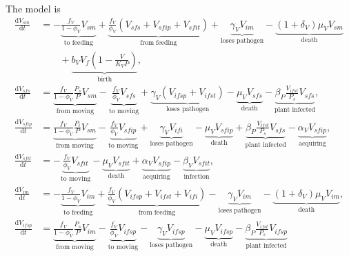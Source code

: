 \documentclass{article}
\newcommand{\md}{\mathrm{d}}
\begin{document}
The model is
\begin{equation}
  \label{odesystem}
  \begin{split}
    \frac{\md V_{sm}}{\md t}
    &=
    - \underbrace{\frac{f_V}{1 - \phi_V} V_{sm}}_{\text{to feeding}}
    + \underbrace{\frac{f_V}{\phi_V} (V_{sfs} + V_{sfip} + V_{sfit})}_{\text{from feeding}}
    + \underbrace{\gamma_V V_{im}}_{\text{loses pathogen}}
    - \underbrace{(1 + \delta_V) \mu_V V_{sm}}_{\text{death}}
    \\ & \quad\quad {}
    + \underbrace{b_V V_f \left(1 - \frac{V}{K_V P}\right)}_{\text{birth}},
    \\
    \frac{\md V_{sfs}}{\md t}
    &=
    \underbrace{\frac{f_V}{1 - \phi_V} \frac{P_s}{P} V_{sm}}_{\text{from moving}}
    - \underbrace{\frac{f_V}{\phi_V} V_{sfs}}_{\text{to moving}}
    + \underbrace{\gamma_V (V_{ifsp} + V_{ifst})}_{\text{loses pathogen}}
    - \underbrace{\mu_V V_{sfs}}_{\text{death}}
    - \underbrace{\beta_P \frac{V_{ifst}}{P_s} V_{sfs}}_{\text{plant
        infected}},
    \\
    \frac{\md V_{sfip}}{\md t}
    &=
    \underbrace{\frac{f_V}{1 - \phi_V} \frac{P_i}{P} V_{sm}}_{\text{from moving}}
    - \underbrace{\frac{f_V}{\phi_V} V_{sfip}}_{\text{to moving}}
    + \underbrace{\gamma_V V_{ifi}}_{\text{loses pathogen}}
    - \underbrace{\mu_V V_{sfip}}_{\text{death}}
    + \underbrace{\beta_P \frac{V_{ifst}}{P_s} V_{sfs}}_{\text{plant infected}}
    - \underbrace{\alpha_V V_{sfip}}_{\text{acquiring}},
    \\
    \frac{\md V_{sfit}}{\md t}
    &=
    - \underbrace{\frac{f_V}{\phi_V} V_{sfit}}_{\text{to moving}}
    - \underbrace{\mu_V V_{sfit}}_{\text{death}}
    + \underbrace{\alpha_V V_{sfip}}_{\text{acquiring}}
    - \underbrace{\beta_V V_{sfit}}_{\text{infection}},
    \\
    \frac{\md V_{im}}{\md t}
    &=
    - \underbrace{\frac{f_V}{1 - \phi_V} V_{im}}_{\text{to feeding}}
    + \underbrace{\frac{f_V}{\phi_V} (V_{ifsp} + V_{ifst} + V_{ifi})}_{\text{from feeding}}
    - \underbrace{\gamma_V V_{im}}_{\text{loses pathogen}}
    - \underbrace{(1 + \delta_V) \mu_V V_{im}}_{\text{death}},
    \\
    \frac{\md V_{ifsp}}{\md t}
    &=
    \underbrace{\frac{f_V}{1 - \phi_V} \frac{P_s}{P} V_{im}}_{\text{from moving}}
    - \underbrace{\frac{f_V}{\phi_V} V_{ifsp}}_{\text{to moving}}
    - \underbrace{\gamma_V V_{ifsp}}_{\text{loses pathogen}}
    - \underbrace{\mu_V V_{ifsp}}_{\text{death}}
    - \underbrace{\beta_P \frac{V_{ifst}}{P_s} V_{ifsp}}_{\text{plant infected}}

\end{split}
\end{equation}
\end{document}
